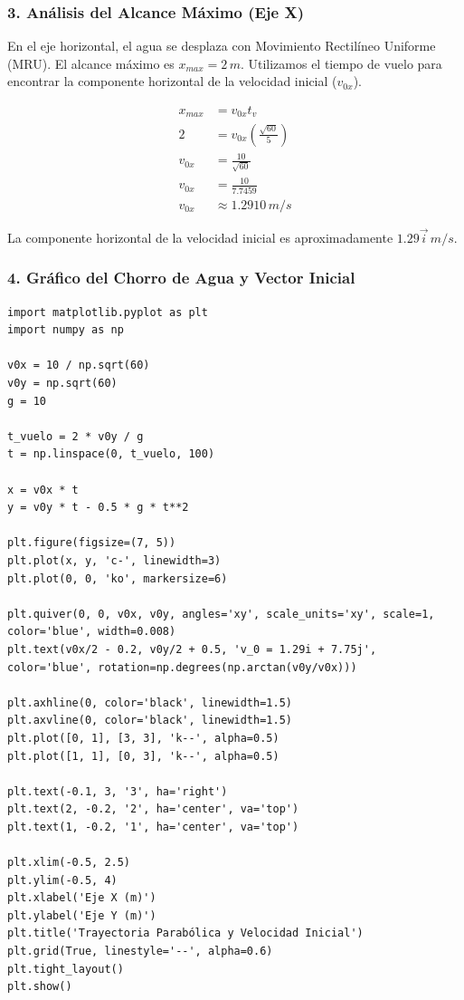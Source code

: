 \documentclass[12pt, a4paper]{article}
\begin{document}
\subsubsection*{3. Análisis del Alcance Máximo (Eje X)}
En el eje horizontal, el agua se desplaza con Movimiento Rectilíneo Uniforme (MRU). El alcance máximo es $x_{max} = 2 \, \si{m}$. Utilizamos el tiempo de vuelo para encontrar la componente horizontal de la velocidad inicial ($v_{0x}$).

\begin{align*}
x_{max} &= v_{0x} t_v \\
2 &= v_{0x} \left(\frac{\sqrt{60}}{5}\right) \\
v_{0x} &= \frac{10}{\sqrt{60}} \\
v_{0x} &= \frac{10}{7.7459} \\
v_{0x} &\approx 1.2910 \, \si{m/s}
\end{align*}

La componente horizontal de la velocidad inicial es aproximadamente $1.29\vec{i} \, \si{m/s}$.


\subsubsection*{4. Gráfico del Chorro de Agua y Vector Inicial}
\begin{verbatim}
import matplotlib.pyplot as plt
import numpy as np

v0x = 10 / np.sqrt(60)
v0y = np.sqrt(60)
g = 10

t_vuelo = 2 * v0y / g
t = np.linspace(0, t_vuelo, 100)

x = v0x * t
y = v0y * t - 0.5 * g * t**2

plt.figure(figsize=(7, 5))
plt.plot(x, y, 'c-', linewidth=3)
plt.plot(0, 0, 'ko', markersize=6)

plt.quiver(0, 0, v0x, v0y, angles='xy', scale_units='xy', scale=1, color='blue', width=0.008)
plt.text(v0x/2 - 0.2, v0y/2 + 0.5, 'v_0 = 1.29i + 7.75j', color='blue', rotation=np.degrees(np.arctan(v0y/v0x)))

plt.axhline(0, color='black', linewidth=1.5)
plt.axvline(0, color='black', linewidth=1.5)
plt.plot([0, 1], [3, 3], 'k--', alpha=0.5)
plt.plot([1, 1], [0, 3], 'k--', alpha=0.5)

plt.text(-0.1, 3, '3', ha='right')
plt.text(2, -0.2, '2', ha='center', va='top')
plt.text(1, -0.2, '1', ha='center', va='top')

plt.xlim(-0.5, 2.5)
plt.ylim(-0.5, 4)
plt.xlabel('Eje X (m)')
plt.ylabel('Eje Y (m)')
plt.title('Trayectoria Parabólica y Velocidad Inicial')
plt.grid(True, linestyle='--', alpha=0.6)
plt.tight_layout()
plt.show()
\end{verbatim}
\end{document}
